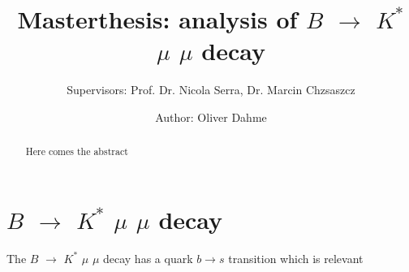 \documentclass[english]{uzhpub}
\begin{document}
\title{Masterthesis: analysis of $B$ $\rightarrow$ $K^{*}$ $\mu$ $\mu$ decay}

\subtitle{Supervisors: Prof. Dr. Nicola Serra, Dr. Marcin Chzsaszcz}

\author{Author: Oliver Dahme}


\maketitle




\begin{abstract}
  Here comes the abstract
\end{abstract}


\section{$B$ $\rightarrow$ $K^{*}$ $\mu$ $\mu$ decay}

The $B$ $\rightarrow$ $K^{*}$ $\mu$ $\mu$ decay has a quark $b \rightarrow s$ transition which is relevant
\end{document}

